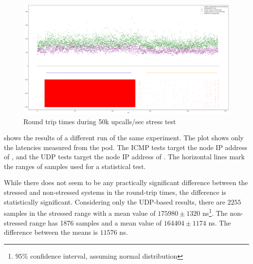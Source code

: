 \begin{figure}
    \centering
    \includegraphics[width=.9\linewidth]{img/packet_flood_50k_latency.png}
    \caption{Round trip times during 50k upcalls/sec stress test}
    \label{fig:plot-packet-flood-50k-latency}
\end{figure}

 shows the results of a different run of the same experiment. The plot shows only the latencies measured from the  pod. The ICMP tests target the node IP address of , and the UDP tests target the node IP address of . The horizontal lines mark the ranges of samples used for a statistical test.

While there does not seem to be any practically significant difference between the stressed and non-stressed systems in the round-trip times, the difference is statistically significant. Considering only the UDP-based results, there are $2255$ samples in the stressed range with a mean value of $175980 \pm 1320$ \si{\nano\second}\footnote{$95\%$ confidence interval, assuming normal distribution}. The non-stressed range has 1876 samples and a mean value of $164404 \pm 1174$ \si{\nano\second}. The difference between the means is $11576$ \si{\nano\second}.

